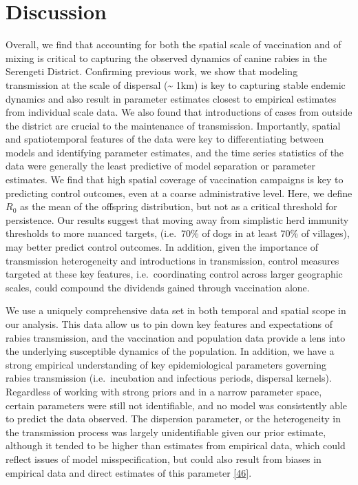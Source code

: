 \documentclass[
  oneside]{book}
\begin{document}
\hypertarget{discussion-2}{%
\section{Discussion}\label{discussion-2}}

Overall, we find that accounting for both the spatial scale of vaccination and of mixing is critical to capturing the observed dynamics of canine rabies in the Serengeti District. Confirming previous work, we show that modeling transmission at the scale of dispersal (\textasciitilde{} 1km) is key to capturing stable endemic dynamics and also result in parameter estimates closest to empirical estimates from individual scale data. We also found that introductions of cases from outside the district are crucial to the maintenance of transmission. Importantly, spatial and spatiotemporal features of the data were key to differentiating between models and identifying parameter estimates, and the time series statistics of the data were generally the least predictive of model separation or parameter estimates. We find that high spatial coverage of vaccination campaigns is key to predicting control outcomes, even at a coarse administrative level. Here, we define \(R_{0}\) as the mean of the offspring distribution, but not as a critical threshold for persistence. Our results suggest that moving away from simplistic herd immunity thresholds to more nuanced targets, (i.e.~70\% of dogs in at least 70\% of villages), may better predict control outcomes. In addition, given the importance of transmission heterogeneity and introductions in transmission, control measures targeted at these key features, i.e.~coordinating control across larger geographic scales, could compound the dividends gained through vaccination alone.

We use a uniquely comprehensive data set in both temporal and spatial scope in our analysis. This data allow us to pin down key features and expectations of rabies transmission, and the vaccination and population data provide a lens into the underlying susceptible dynamics of the population. In addition, we have a strong empirical understanding of key epidemiological parameters governing rabies transmission (i.e.~incubation and infectious periods, dispersal kernels). Regardless of working with strong priors and in a narrow parameter space, certain parameters were still not identifiable, and no model was consistently able to predict the data observed. The dispersion parameter, or the heterogeneity in the transmission process was largely unidentifiable given our prior estimate, although it tended to be higher than estimates from empirical data, which could reflect issues of model misspecification, but could also result from biases in empirical data and direct estimates of this parameter \protect\hyperlink{ref-susswein2020}{{[}46{]}}.
\end{document}

